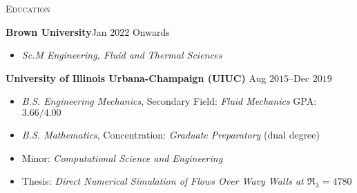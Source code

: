 \documentclass[10pt]{article}
\begin{document}
\begin{multicols}{2}
\textsc{Education}
\columnbreak

\textbf{Brown University}\hfill Jan $2022$ Onwards

\vspace{-1.75em}
\begin{itemize}[label= ,leftmargin=1.0em]
    \setlength\itemsep{-0.25em}
    \item \textit{Sc.M Engineering, Fluid and Thermal Sciences}
\end{itemize}
\vspace{-2.0em}

\vspace{0.5em}
%
\textbf{University of Illinois Urbana-Champaign (UIUC)} \hfill Aug $2015$--Dec $2019$

\vspace{-1.75em}
\begin{itemize}[label= ,leftmargin=1.0em]
    \setlength\itemsep{-0.25em}
    \item \textit{B.S. Engineering Mechanics}, Secondary Field: \textit{Fluid Mechanics} \hfill GPA: $3.66/4.00$
    \item \textit{B.S. Mathematics}, Concentration: \textit{Graduate Preparatory} \hfill (dual degree)
    \item Minor: \textit{Computational Science and Engineering}
    \item Thesis: \textit{Direct Numerical Simulation of Flows Over Wavy Walls at $\Re_\lambda=4780$}
\end{itemize}
\vspace{-2.0em}

\end{multicols}
\vspace{-1.5em}
\end{document}
